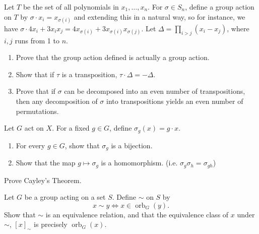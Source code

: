 \documentclass[./main.tex]{subfiles}
\begin{document}
\begin{exercise}
\label{exercise:permutation-sign-using-group-actions}
    Let $T$ be the set of all polynomials in $x_1, \dots, x_n$. For $\sigma \in
    S_n$, define a group action on $T$ by $\sigma \cdot x_i = x_{\sigma(i)}$ and
    extending this in a natural way, so for instance, we have $\sigma \cdot 4x_i
    + 3x_i x_j = 4x_{\sigma(i)} + 3 x_{\sigma(i)} x_{\sigma(j)}$. Let $\Delta =
    \prod_{i > j} (x_i - x_j)$, where $i, j$ runs from 1 to $n$.
    
    \begin{enumerate}
        \item Prove that the group action defined is actually a group action.
        \item Show that if $\tau$ is a transposition, $\tau \cdot \Delta = -\Delta$.
        \item Prove that if $\sigma$ can be decomposed into an even number of
        transpositions, then any decomposition of $\sigma$ into transpositions
        yields an even number of permutations.
    \end{enumerate}
\end{exercise}

\begin{exercise}
\label{ex:group-actions-symmetric-group}
    Let $G$ act on $X$. For a fixed $g \in G$, define $\sigma_g(x) = g \cdot x$. 
    \begin{enumerate}
        \item For every $g \in G$, show that $\sigma_g$ is a bijection.
        \item Show that the map $g \mapsto \sigma_g$ is a homomorphism. (i.e.
        $\sigma_g \sigma_h = \sigma_{gh}$)
    \end{enumerate}
\end{exercise}

\begin{exercise}
\label{ex:cayley-thm}
    Prove Cayley's Theorem. 
\end{exercise}

\begin{exercise}
\label{ex:orbits-partition-set}
    Let $G$ be a group acting on a set $S$. Define $\sim$ on $S$ by
    \[
        x \sim y \iff x \in \operatorname{orb}_G (y).
    \]
    Show that $\sim$ is an equivalence relation, and that the equivalence class
    of $x$ under $\sim$, $[x]_\sim$ is precisely $\operatorname{orb}_G(x)$. 
\end{exercise}
\end{document}
